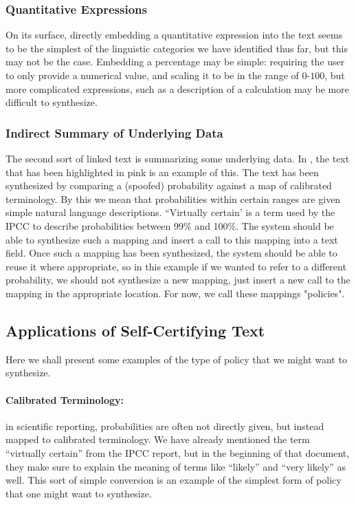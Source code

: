 \subsubsection{Quantitative Expressions}
On its surface, directly embedding a quantitative expression into the text seems to be the simplest
of the linguistic categories we have identified thus far, but this may not be the case. Embedding
a percentage may be simple: requiring the user to only provide a numerical value, and scaling it
to be in the range of $0$-$100$, but more complicated expressions, such as a description of a calculation
may be more difficult to synthesize. 


\subsubsection{Indirect Summary of Underlying Data}
The second sort of linked text is summarizing some underlying data. In ,
the text that has been highlighted in pink is an example of this. The text has been synthesized
by comparing a (spoofed) probability against a map of calibrated terminology. By this we mean that
probabilities within certain ranges are given simple natural language descriptions. ``Virtually certain'
is a term used by the IPCC to describe probabilities between 99\% and 100\%. The system should be able
to synthesize such a mapping and insert a call to this mapping into a text field. Once such a mapping
has been synthesized, the system should be able to reuse it where appropriate, so in this example if
we wanted to refer to a different probability, we should not synthesize a new mapping, just insert
a new call to the mapping in the appropriate location. For now, we call these mappings "policies".

\subsection{Applications of Self-Certifying Text}
Here we shall present some examples of the type of policy that we might want to synthesize.

\paragraph{Calibrated Terminology:} in scientific reporting, probabilities are often not directly given, but instead
mapped to calibrated terminology. We have already mentioned the term ``virtually certain'' from the IPCC report, but in the beginning
of that document, they make sure to explain the meaning of terms like ``likely'' and ``very likely'' as well. This
sort of simple conversion is an example of the simplest form of policy that one might want to synthesize.


